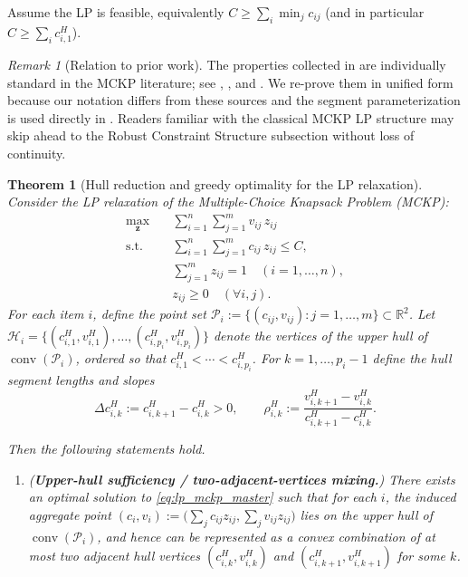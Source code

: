 \documentclass[11pt, a4paper]{article}
\theoremstyle{plain}
\newtheorem{theorem}{Theorem}
\theoremstyle{definition}
\theoremstyle{remark}
\newtheorem{remark}[remark]{Remark}
\begin{document}
Assume the LP is feasible, equivalently $C \ge \sum_i \min_j c_{ij}$ (and in particular $C \ge \sum_i c^H_{i,1}$).
\begin{remark}[Relation to prior work]\label{rem:prior_hull}
The properties collected in  are individually standard in the MCKP literature; see \citet{Dyer1984}, \citet{Pisinger1995}, and \citet[Chapter~11]{Kellerer2004}. We re-prove them in unified form because our notation differs from these sources and the segment parameterization is used directly in . Readers familiar with the classical MCKP LP structure may skip ahead to the Robust Constraint Structure subsection without loss of continuity.
\end{remark}
\begin{theorem}[Hull reduction and greedy optimality for the LP relaxation]\label{thm:master_greedy}
Consider the LP relaxation of the Multiple-Choice Knapsack Problem (MCKP):
\begin{align}\label{eq:lp_mckp_master}
\max_{\bm{z}} \quad & \sum_{i=1}^n\sum_{j=1}^m v_{ij}\,z_{ij}\\
\text{s.t.}\quad & \sum_{i=1}^n\sum_{j=1}^m c_{ij}\,z_{ij}\le C,\nonumber\\
& \sum_{j=1}^m z_{ij}=1 \quad (i=1,\dots,n),\nonumber\\
& z_{ij}\ge 0 \quad (\forall i,j).\nonumber
\end{align}
For each item $i$, define the point set $\mathcal P_i:=\{(c_{ij},v_{ij}) : j=1,\dots,m\}\subset\mathbb R^2$.
Let $\mathcal H_i=\{(c^H_{i,1},v^H_{i,1}),\allowbreak\dots,\allowbreak(c^H_{i,p_i},v^H_{i,p_i})\}$ denote the vertices of the \emph{upper hull}
of $\operatorname{conv}(\mathcal P_i)$, ordered so that $c^H_{i,1}<\cdots<c^H_{i,p_i}$.
For $k=1,\dots,p_i-1$ define the hull segment lengths and slopes
\[
\Delta c^H_{i,k}:=c^H_{i,k+1}-c^H_{i,k}>0,
\qquad
\rho^H_{i,k}:=\frac{v^H_{i,k+1}-v^H_{i,k}}{c^H_{i,k+1}-c^H_{i,k}}.
\]

Then the following statements hold.

\begin{enumerate}
\item[(i)] (\textbf{Upper-hull sufficiency / two-adjacent-vertices mixing.})
There exists an optimal solution to \eqref{eq:lp_mckp_master} such that for each $i$,
the induced aggregate point $(c_i,v_i):=\big(\sum_j c_{ij}z_{ij},\sum_j v_{ij}z_{ij}\big)$ lies on the upper hull of
$\operatorname{conv}(\mathcal P_i)$, and hence can be represented as a convex combination of at most two \emph{adjacent} hull vertices
$(c^H_{i,k},v^H_{i,k})$ and $(c^H_{i,k+1},v^H_{i,k+1})$ for some $k$.


\end{enumerate}
\end{theorem}
\end{document}
